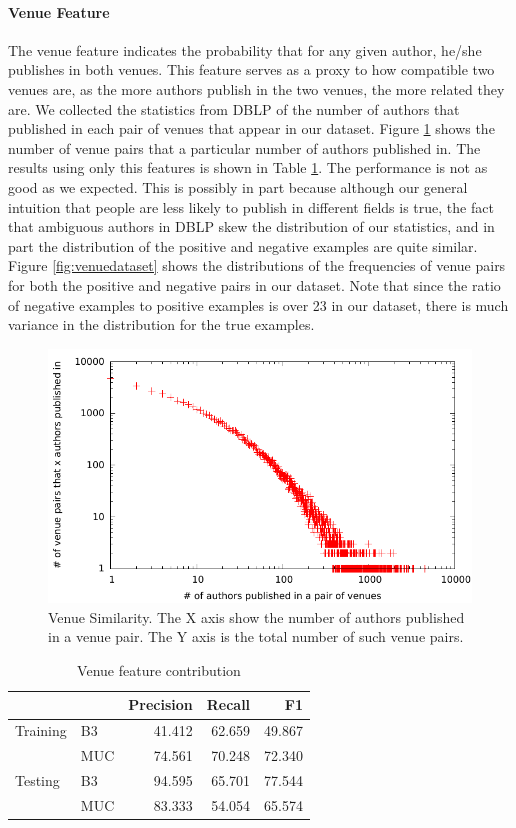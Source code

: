 \documentclass[twocolumn,letterpaper]{article}
\begin{document}
\paragraph{Venue Feature} %
\label{par:venue}
The venue feature indicates the probability that for any given author, he/she publishes in both venues.  This feature serves as a proxy to how compatible two venues are, as the more authors publish in the two venues, the more related they are.  We collected the statistics from DBLP of the number of authors that published in each pair of venues that appear in our dataset.  Figure \ref{fig:venue} shows the number of venue pairs that a particular number of authors published in.  The results using only this features is shown in Table \ref{tab:venue}.  The performance is not as good as we expected.  This is possibly in part because although our general intuition that people are less likely to publish in different fields is true, the fact that ambiguous authors in DBLP skew the distribution of our statistics, and in part the distribution of the positive and negative examples are quite similar.  Figure \ref{fig:venuedataset} shows the distributions of the frequencies of venue pairs for both the positive and negative pairs in our dataset.  Note that since the ratio of negative examples to positive examples is over 23 in our dataset, there is much variance in the distribution for the true examples.
\begin{figure}
  \centering
  \includegraphics[width=\columnwidth]{venuepair}
  \caption{Venue Similarity.  The X axis show the number of authors published in a venue pair.  The Y axis is the total number of such venue pairs.}
  \label{fig:venue}
\end{figure}

\begin{table}
\begin{tabular}{l || l | r r r}
 & & Precision & Recall & F1 \\ \hline
Training & B3 & 41.412 & 62.659 & 49.867 \\
 & MUC & 74.561 & 70.248 & 72.340\\ \hline
Testing & B3 & 94.595 & 65.701 & 77.544 \\
 & MUC & 83.333 & 54.054 & 65.574 \\
\end{tabular}
\caption{Venue feature contribution}
\label{tab:venue}
\end{table}
\end{document}
